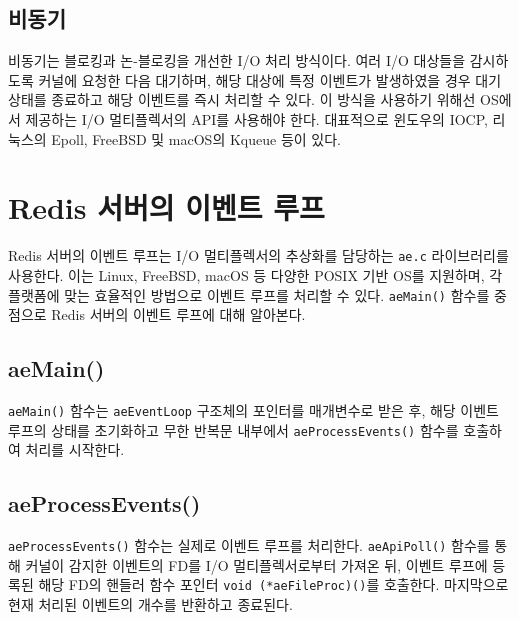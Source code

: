 \documentclass[11pt]{article}
\begin{document}
\subsection{비동기}
비동기는 블로킹과 논-블로킹을 개선한 I/O 처리 방식이다. 여러 I/O 대상들을 감시하도록
커널에 요청한 다음 대기하며, 해당 대상에 특정 이벤트가 발생하였을 경우 대기 상태를
종료하고 해당 이벤트를 즉시 처리할 수 있다. 이 방식을 사용하기 위해선 OS에서 제공하는
I/O 멀티플렉서의 API를 사용해야 한다. 대표적으로 윈도우의 IOCP, 리눅스의 Epoll,
FreeBSD 및 macOS의 Kqueue 등이 있다.

\section{Redis 서버의 이벤트 루프}
Redis 서버의 이벤트 루프는 I/O 멀티플렉서의 추상화를 담당하는 \texttt{ae.c}
라이브러리를 사용한다. 이는 Linux, FreeBSD, macOS 등 다양한 POSIX 기반 OS를
지원하며, 각 플랫폼에 맞는 효율적인 방법으로 이벤트 루프를 처리할 수 있다.
\texttt{aeMain()} 함수를 중점으로 Redis 서버의 이벤트 루프에 대해 알아본다.

\vspace{.2in}
\vspace{.2in}

\subsection{aeMain()}
\texttt{aeMain()} 함수는 \texttt{aeEventLoop} 구조체의 포인터를 매개변수로 받은
후, 해당 이벤트 루프의 상태를 초기화하고 무한 반복문 내부에서
\texttt{aeProcessEvents()} 함수를 호출하여 처리를 시작한다.

\subsection{aeProcessEvents()}
\texttt{aeProcessEvents()} 함수는 실제로 이벤트 루프를 처리한다.
\texttt{aeApiPoll()} 함수를 통해 커널이 감지한 이벤트의 FD를 I/O 멀티플렉서로부터
가져온 뒤, 이벤트 루프에 등록된 해당 FD의 핸들러 함수 포인터
\texttt{void (*aeFileProc)()}를 호출한다. 마지막으로 현재 처리된 이벤트의 개수를
반환하고 종료된다.
\end{document}
